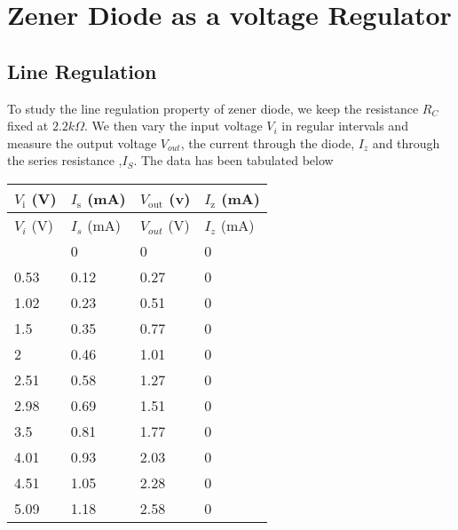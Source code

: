 \documentclass[12pt]{article}
\begin{document}
\section{Zener Diode as a voltage Regulator}
\subsection{Line Regulation}

To study the line regulation property of zener diode, we keep the resistance $R_C$ fixed at $2.2k\Omega$. We then vary the input voltage $V_i$ in regular intervals and measure the output voltage $V_{out}$, the current through the diode, $I_{z}$ and through the series resistance ,$I_S$. The data has been tabulated below


\begin{longtable}{|l|l|l|l|}
	\hline
  $V_\mathrm{i}$ (V) & $I_\mathrm{s}$ (mA) & $V_\mathrm{out}$ (v) & $I_\mathrm{z}$ (mA) \\ \hline
	\endfirsthead
	\hline
	$V_i$ (V) & $I_s$ (mA) & $V_{out}$ (V) & $I_z$ (mA) \\ \hline
	\endhead
	\hline
	\endfoot
	\hline
	\endlastfoot
    0                 & 0                 & 0                  & 0                 \\ \hline
    0.53              & 0.12              & 0.27               & 0                 \\ \hline
    1.02              & 0.23              & 0.51               & 0                 \\ \hline
    1.5               & 0.35              & 0.77               & 0                 \\ \hline
    2                 & 0.46              & 1.01               & 0                 \\ \hline
    2.51              & 0.58              & 1.27               & 0                 \\ \hline
    2.98              & 0.69              & 1.51               & 0                 \\ \hline
    3.5               & 0.81              & 1.77               & 0                 \\ \hline
    4.01              & 0.93              & 2.03               & 0                 \\ \hline
    4.51              & 1.05              & 2.28               & 0                 \\ \hline
    5.09              & 1.18              & 2.58               & 0                 \\ \hline

\end{longtable}
\end{document}
